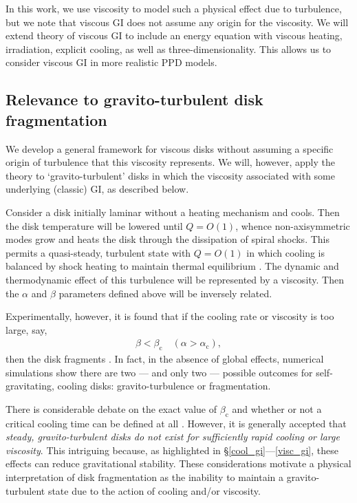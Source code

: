 \documentclass[iop, numberedappendix]{emulateapj}
\begin{document}
In this work, we use viscosity to model such a 
physical effect due to turbulence, but we note that viscous 
GI does not assume any origin for the viscosity. We will extend theory
of viscous GI to include an energy equation  with viscous heating,
irradiation, explicit cooling, as well as three-dimensionality. This
allows us to consider viscous GI in more realistic PPD models. 



\subsection{Relevance to gravito-turbulent disk fragmentation}
We develop a general framework for viscous disks without  
assuming a specific origin of turbulence that this viscosity 
represents. We will, however, apply the theory to `gravito-turbulent'
disks in which the viscosity associated with some underlying (classic)
GI, as described below.  

Consider a disk initially laminar without a heating mechanism and
cools. Then the disk temperature will be lowered until $Q=O(1)$, whence
non-axisymmetric modes grow and heats the disk through the dissipation
of spiral shocks. %
This permits a quasi-steady, turbulent state with
$Q =O(1)$ in which cooling is balanced by shock heating to maintain
thermal equilibrium \citep{gammie01}. 
The dynamic and thermodynamic effect of this turbulence will be
represented by a viscosity. Then the $\alpha$ and $\beta$ parameters
defined above will be inversely related. 

Experimentally, however, it is found that if the cooling rate or
viscosity is too large, say,   
\begin{align}\label{frag_cond}
  \beta < \beta_\mathrm{c} \quad
  \left(\alpha>\alpha_\mathrm{c}\right), 
\end{align}
then the disk fragments \citep{gammie01,rice05,rice11}. In fact, in
the absence of global effects, numerical simulations show there are
two --- and only two --- possible outcomes for self-gravitating,
cooling disks: gravito-turbulence or fragmentation.  

There is considerable debate on the exact value of $\beta_\mathrm{c}$ 
and whether or not a critical cooling time can be defined at all 
\citep{meru11,lodato11,meru12,paardekooper12,hopkins13}. 
However, it is generally accepted that \emph{steady, gravito-turbulent
  disks do not  
  exist for sufficiently rapid cooling or large viscosity}.  
This intriguing because, as highlighted in
\S\ref{cool_gi}---\ref{visc_gi}, these effects can reduce
gravitational stability. These considerations motivate a physical    
interpretation of disk fragmentation as the inability to maintain a
gravito-turbulent state due to the action of cooling and/or viscosity.
\end{document}
